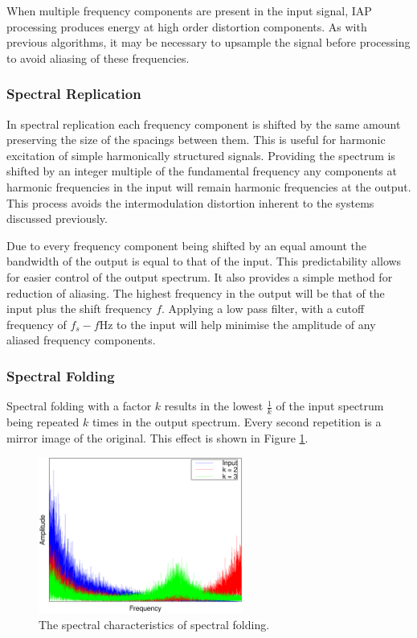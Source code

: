 			When multiple frequency components are present in the input signal, IAP processing produces energy
			at high order distortion components. As with previous algorithms, it may be necessary to upsample
			the signal before processing to avoid aliasing of these frequencies.

		\subsubsection*{Spectral Replication}
			In spectral replication each frequency component is shifted by the same amount preserving the size
			of the spacings between them. This is useful for harmonic excitation of simple harmonically
			structured signals. Providing the spectrum is shifted by an integer multiple of the fundamental
			frequency any components at harmonic frequencies in the input will remain harmonic frequencies at
			the output. This process avoids the intermodulation distortion inherent to the systems discussed
			previously. 

			Due to every frequency component being shifted by an equal amount the bandwidth of the output is
			equal to that of the input. This predictability allows for easier control of the output spectrum.
			It also provides a simple method for reduction of aliasing. The highest frequency in the output
			will be that of the input plus the shift frequency $f$. Applying a low pass filter, with a cutoff
			frequency of $f_{s} - f$Hz to the input will help minimise the amplitude of any aliased
			frequency components.

		\subsubsection*{Spectral Folding}
			Spectral folding with a factor $k$ results in the lowest $\frac{1}{k}$ of the input spectrum being
			repeated $k$ times in the output spectrum. Every second repetition is a mirror image of the
			original. This effect is shown in Figure \ref{fig:SpectralFolding}. 
			
			\begin{figure}[h!]
				\centering
				\includegraphics[width=0.6\textwidth]{chapter5/Images/SpectralFoldingSpectrum.eps}
				\caption{The spectral characteristics of spectral folding.}
				\label{fig:SpectralFolding}
			\end{figure}

